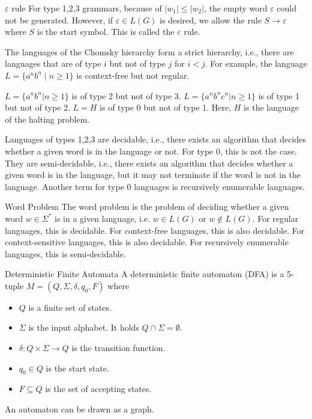 \documentclass{beamer}
\begin{document}
\begin{frame}{$\varepsilon$ rule}
    For type 1,2,3 grammars, because of $|w_1|\leq |w_2|$, the empty word $\varepsilon$ could not be generated. However, if $\varepsilon\in L(G)$ is desired, we allow the rule $S\to\varepsilon$ where $S$ is the start symbol. This is called the $\varepsilon$ rule.
\end{frame}
\begin{frame}
The languages of the Chomsky hierarchy form a strict hierarchy, i.e., there are languages that are of type $i$ but not of type $j$ for $i<j$. For example, the language $L=\{a^nb^n\mid n\geq 1\}$ is context-free but not regular.
\begin{example}
    $L=\{a^nb^n|n\geq 1\}$ is of type 2 but not of type 3. $L=\{a^nb^nc^n|n\geq 1\}$ is of type 1 but not of type 2. $L=H$ is of type 0 but not of type 1. Here, $H$ is the language of the halting problem.
\end{example}
Languages of types 1,2,3 are decidable, i.e., there exists an algorithm that decides whether a given word is in the language or not. For type 0, this is not the case. They are semi-decidable, i.e., there exists an algorithm that decides whether a given word is in the language, but it may not terminate if the word is not in the language. Another term for type 0 languages is recursively enumerable languages.
\end{frame}

\begin{frame}{Word Problem}
    The word problem is the problem of deciding whether a given word $w\in\Sigma^*$ is in a given language, i.e. $w\in L(G)$ or $w\notin L(G)$. For regular languages, this is decidable. For context-free languages, this is also decidable. For context-sensitive languages, this is also decidable. For recursively enumerable languages, this is semi-decidable.
\end{frame}

\begin{frame}{Deterministic Finite Automata}
    A deterministic finite automaton (DFA) is a 5-tuple $M=(Q,\Sigma,\delta,q_0,F)$ where
    \begin{itemize}
        \item $Q$ is a finite set of states.
        \item $\Sigma$ is the input alphabet. It holds $Q\cap \Sigma=\emptyset$.
        \item $\delta:Q\times \Sigma\to Q$ is the transition function.
        \item $q_0\in Q$ is the start state.
        \item $F\subseteq Q$ is the set of accepting states.
    \end{itemize}
    An automaton can be drawn as a graph.

\end{frame}
\end{document}
